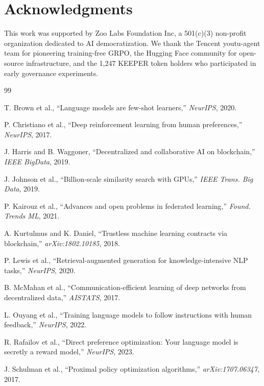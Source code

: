 \section*{Acknowledgments}


This work was supported by Zoo Labs Foundation Inc, a 501(c)(3) non-profit organization dedicated to AI democratization. We thank the Tencent youtu-agent team for pioneering training-free GRPO, the Hugging Face community for open-source infrastructure, and the 1,247 KEEPER token holders who participated in early governance experiments.


\begin{thebibliography}{99}

T. Brown et al., ``Language models are few-shot learners,'' \textit{NeurIPS}, 2020.

P. Christiano et al., ``Deep reinforcement learning from human preferences,'' \textit{NeurIPS}, 2017.

J. Harris and B. Waggoner, ``Decentralized and collaborative AI on blockchain,'' \textit{IEEE BigData}, 2019.

J. Johnson et al., ``Billion-scale similarity search with GPUs,'' \textit{IEEE Trans. Big Data}, 2019.

P. Kairouz et al., ``Advances and open problems in federated learning,'' \textit{Found. Trends ML}, 2021.

A. Kurtulmus and K. Daniel, ``Trustless machine learning contracts via blockchain,'' \textit{arXiv:1802.10185}, 2018.

P. Lewis et al., ``Retrieval-augmented generation for knowledge-intensive NLP tasks,'' \textit{NeurIPS}, 2020.

B. McMahan et al., ``Communication-efficient learning of deep networks from decentralized data,'' \textit{AISTATS}, 2017.

L. Ouyang et al., ``Training language models to follow instructions with human feedback,'' \textit{NeurIPS}, 2022.

R. Rafailov et al., ``Direct preference optimization: Your language model is secretly a reward model,'' \textit{NeurIPS}, 2023.

J. Schulman et al., ``Proximal policy optimization algorithms,'' \textit{arXiv:1707.06347}, 2017.


\end{thebibliography}
